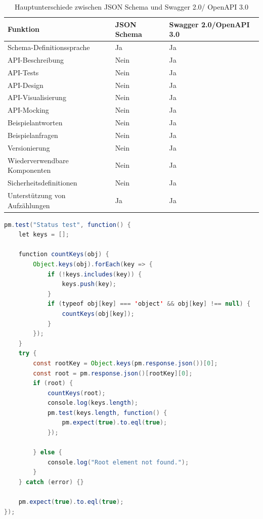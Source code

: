 \documentclass[notitlepage, hidelinks]{article}
\begin{document}
\begin{table}[H]
\centering
\begin{tabular}{|L{4cm}|L{2cm}|L{2cm}|}
\hline
\textbf{Funktion} & \textbf{JSON Schema} & \textbf{Swagger 2.0/OpenAPI 3.0} \\ \hline
Schema-Definitionssprache & Ja & Ja \\ \hline
API-Beschreibung & Nein & Ja \\ \hline
API-Tests & Nein & Ja \\ \hline
API-Design & Nein & Ja \\ \hline
API-Visualisierung & Nein & Ja \\ \hline
API-Mocking & Nein & Ja \\ \hline
Beispielantworten & Nein & Ja \\ \hline
Beispielanfragen & Nein & Ja \\ \hline
Versionierung & Nein & Ja \\ \hline
Wiederverwendbare Komponenten & Nein & Ja \\ \hline
Sicherheitsdefinitionen & Nein & Ja \\ \hline
Unterstützung von Aufzählungen & Ja & Ja \\ \hline
\end{tabular}
\caption{Hauptunterschiede zwischen JSON Schema und Swagger 2.0/ OpenAPI 3.0}
\label{table:api-specs}
\end{table}

\begin{lstlisting}[language=Java,frame=single,caption=Testscript in Postman zum rekursiven Auslesen der zurückgegeben Objekte (distinct keys)\, die Ergebnisse können dann in Flows visualisiert werden\, s. Abb.\ref{flows},label=flowsscript]
pm.test("Status test", function() {
    let keys = [];

    function countKeys(obj) {
        Object.keys(obj).forEach(key => {
            if (!keys.includes(key)) {
                keys.push(key);
            }
            if (typeof obj[key] === 'object' && obj[key] !== null) {
                countKeys(obj[key]);
            }
        });
    }
    try {
        const rootKey = Object.keys(pm.response.json())[0];
        const root = pm.response.json()[rootKey][0];
        if (root) {
            countKeys(root);
            console.log(keys.length);
            pm.test(keys.length, function() {
                pm.expect(true).to.eql(true);
            });

        } else {
            console.log("Root element not found.");
        }
    } catch (error) {}

    pm.expect(true).to.eql(true);
});
\end{lstlisting}
\end{document}
